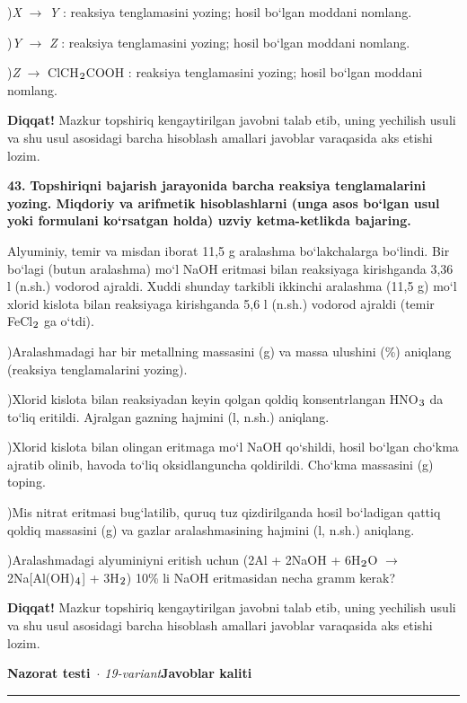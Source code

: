 \documentclass[11pt,a4paper]{article}
\renewcommand{\textsubscript}[1]{\ensuremath{_{\text{\fontsize{8}{8}\selectfont #1}}}}
\newcommand{\diqqat}[1]{\par\smallskip\noindent\textbf{Diqqat!} #1\par\medskip}
\begin{document}
)\textit{X} $\to$ \textit{Y} : reaksiya tenglamasini yozing; hosil bo`lgan moddani nomlang.\par
{})\textit{Y} $\to$ \textit{Z} : reaksiya tenglamasini yozing; hosil bo`lgan moddani nomlang.\par
{})\textit{Z} $\to$ ClCH\textsubscript{2}COOH : reaksiya tenglamasini yozing; hosil bo`lgan moddani nomlang.\par
\diqqat{Mazkur topshiriq kengaytirilgan javobni talab etib, uning yechilish usuli va shu usul asosidagi barcha hisoblash amallari javoblar varaqasida aks etishi lozim.}
\noindent\textbf{43.} \textbf{Topshiriqni bajarish jarayonida barcha reaksiya tenglamalarini yozing. Miqdoriy va arifmetik hisoblashlarni (unga asos bo`lgan usul yoki formulani ko`rsatgan holda) uzviy ketma-ketlikda bajaring.}\par\smallskip
Alyuminiy, temir va misdan iborat 11,5 g aralashma bo`lakchalarga bo`lindi. Bir bo`lagi (butun aralashma) mo`l NaOH eritmasi bilan reaksiyaga kirishganda 3,36 l (n.sh.) vodorod ajraldi. Xuddi shunday tarkibli ikkinchi aralashma (11,5 g) mo`l xlorid kislota bilan reaksiyaga kirishganda 5,6 l (n.sh.) vodorod ajraldi (temir FeCl\textsubscript{2} ga o`tdi).\par
{})Aralashmadagi har bir metallning massasini (g) va massa ulushini (\%) aniqlang (reaksiya tenglamalarini yozing).\par
{})Xlorid kislota bilan reaksiyadan keyin qolgan qoldiq konsentrlangan HNO\textsubscript{3} da to`liq eritildi. Ajralgan gazning hajmini (l, n.sh.) aniqlang.\par
{})Xlorid kislota bilan olingan eritmaga mo`l NaOH qo`shildi, hosil bo`lgan cho`kma ajratib olinib, havoda to`liq oksidlanguncha qoldirildi. Cho`kma massasini (g) toping.\par
{})Mis nitrat eritmasi bug`latilib, quruq tuz qizdirilganda hosil bo`ladigan qattiq qoldiq massasini (g) va gazlar aralashmasining hajmini (l, n.sh.) aniqlang.\par
{})Aralashmadagi alyuminiyni eritish uchun (2Al + 2NaOH + 6H\textsubscript{2}O $\to$ 2Na[Al(OH)\textsubscript{4}] + 3H\textsubscript{2}) 10\% li NaOH eritmasidan necha gramm kerak?\par
\diqqat{Mazkur topshiriq kengaytirilgan javobni talab etib, uning yechilish usuli va shu usul asosidagi barcha hisoblash amallari javoblar varaqasida aks etishi lozim.}
\newpage
\noindent\textbf{\fontsize{13}{15}\selectfont Nazorat testi}\ \textit{$\cdot$ 19-variant}\hfill \textbf{Javoblar kaliti}\par\smallskip\hrule\smallskip
\end{document}
